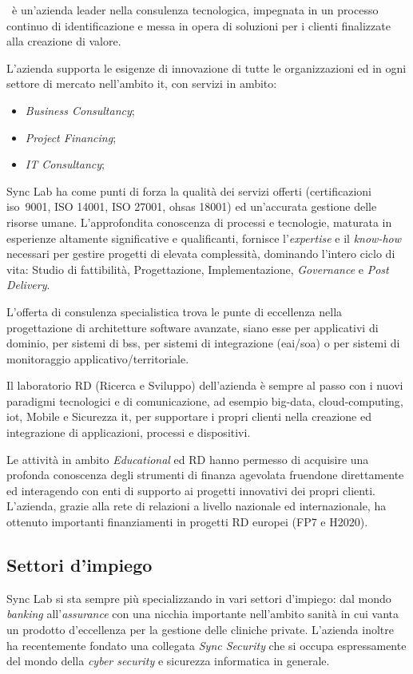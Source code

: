 \myCompany\ è un'azienda leader nella consulenza tecnologica, impegnata in un
processo continuo di identificazione e messa in opera di soluzioni per i clienti finalizzate
alla creazione di valore.

L'azienda supporta le esigenze di innovazione di tutte le
organizzazioni ed in ogni settore di mercato nell'ambito \gls{it}, con
servizi in ambito:
\begin{itemize}
	\item \textit{Business Consultancy};
	\item \textit{Project Financing};
	\item \textit{IT Consultancy};
\end{itemize}

Sync Lab ha come punti di forza la qualità dei servizi offerti (certificazioni \acrshort{iso}\gloss\ 9001,
ISO 14001, ISO 27001, \acrshort{ohsas} 18001) ed un'accurata gestione delle risorse umane.
L'approfondita conoscenza di processi e tecnologie, maturata in esperienze altamente
significative e qualificanti, fornisce l'\textit{expertise} e il \textit{know-how} necessari per gestire
progetti di elevata complessità, dominando l'intero ciclo di vita: Studio di fattibilità,
Progettazione, Implementazione, \textit{Governance} e \textit{Post Delivery}.

L'offerta di consulenza specialistica trova le punte di eccellenza nella progettazione di
architetture software avanzate, siano esse per applicativi di dominio, per sistemi di
\gls{bss}, per sistemi di integrazione (\acrshort{eai}/\acrshort{soa}) o per sistemi di
monitoraggio applicativo/territoriale.

Il laboratorio RD (Ricerca e Sviluppo) dell'azienda è sempre al passo con i nuovi
paradigmi tecnologici e di comunicazione, ad esempio \gls{big-data}\gloss, \gls{cloud-computing}\gloss,
\gls{iot}\gloss, Mobile e Sicurezza \acrshort{it}, per supportare i propri clienti nella creazione
ed integrazione di applicazioni, processi e dispositivi.

Le attività in ambito \textit{Educational} ed RD hanno permesso di acquisire una profonda
conoscenza degli strumenti di finanza agevolata fruendone direttamente ed interagendo
con enti di supporto ai progetti innovativi dei propri clienti. L'azienda, grazie alla rete
di relazioni a livello nazionale ed internazionale, ha ottenuto importanti finanziamenti
in progetti RD europei (FP7 e H2020).

\subsection{Settori d'impiego}

Sync Lab si sta sempre più specializzando in vari settori d'impiego: dal mondo \textit{banking}
all'\textit{assurance} con una nicchia importante nell'ambito sanità in cui vanta un prodotto
d'eccellenza per la gestione delle cliniche private.
L'azienda inoltre ha recentemente fondato una collegata \textit{Sync Security} che si occupa
espressamente del mondo della \textit{cyber security} e sicurezza informatica in generale.

